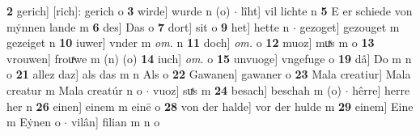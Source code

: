 \documentclass[8pt,a4paper,notitlepage]{article}
\begin{document}
\begin{table}[ht]
\begin{minipage}[t]{0.5\linewidth}
\textbf{2} gerich] [rich]: gerich o \textbf{3} wirde] wurde n (o)  $\cdot$ lîht] vil lichte n \textbf{5} E er schiede von mẏnnen lande m \textbf{6} des] Das o \textbf{7} dort] sit o \textbf{9} het] hette n  $\cdot$ gezoget] gezouget m gezeiget n \textbf{10} iuwer] vnder m \textit{om.} n \textbf{11} doch] \textit{om.} o \textbf{12} muoz] muͯs m o \textbf{13} vrouwen] frouͯwe m (n) (o) \textbf{14} iuch] \textit{om.} o \textbf{15} unvuoge] vngefuge o \textbf{19} dâ] Do m n o \textbf{21} allez daz] als das m n Als o \textbf{22} Gawanen] gawaner o \textbf{23} Mala creatiur] Mala creatur m Mala creatúr n o  $\cdot$ vuoz] suͯs m \textbf{24} besach] beschah m (o)  $\cdot$ hêrre] herre her n \textbf{26} einen] einem m einē o \textbf{28} von der halde] vor der hulde m \textbf{29} einem] Eine m Eẏnen o  $\cdot$ vilân] filian m n o \newline
\end{minipage}
\end{table}
\newpage
\end{document}
